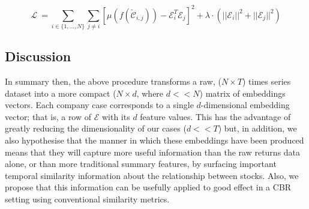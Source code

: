 \documentclass[runningheads]{llncs}
\begin{document}


\begin{equation}\label{eqn:loss_transformed}
    \mathcal{L} ~= 
    \sum_{i\in\{1,...,N\}}\sum_{j\neq i} 
    \left[
    \mu\left(
    f(\tilde{\mathcal{C}}_{i,j})
    \right)
    - 
    \mathcal{E}_i^T\mathcal{E}_j\right]^2
    +
     \lambda \cdot \left( ||\mathcal{E}_i||^2 + ||\mathcal{E}_j||^2 \right)
\end{equation}

\subsection{Discussion}
In summary then, the above procedure transforms a raw, ($N\times T$) times series dataset into a more compact ($N\times d$, where $d<<N$) matrix of embeddings vectors. Each company case corresponds to a single $d$-dimensional embedding vector; that is, a row of $\mathcal{E}$ with its $d$ feature values. This has the advantage of greatly reducing the dimensionality of our cases ($d<<T$) but, in addition, we also hypothesise that the manner in which these embeddings have been produced means that they will capture more useful information than the raw returns data alone, or than more traditional summary features, by surfacing important temporal similarity information about the relationship between stocks. Also, we propose that this information can be usefully applied to good effect in a CBR setting using conventional similarity metrics.
\end{document}
